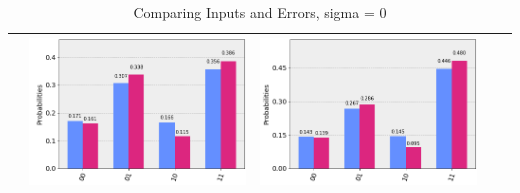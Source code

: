\documentclass[11pt]{article}
\begin{document}
\begin{table}[h!]
\begin{tabular}{| c | c | c | c | c | }
\begin{minipage}{.215\textwidth}
      \end{minipage}
      &\begin{minipage}{.215\textwidth}
        \includegraphics[width=\linewidth]{img/qecc3_Z11.png}
      \end{minipage}
      &\begin{minipage}{.215\textwidth}
        \includegraphics[width=\linewidth]{img/qecc3_I11.png}
      \end{minipage}
      \\ \hline
    \end{tabular}
    \caption{Comparing Inputs and Errors, sigma = 0}\label{tbl:sig0}
  \end{table}
  
\end{document}
